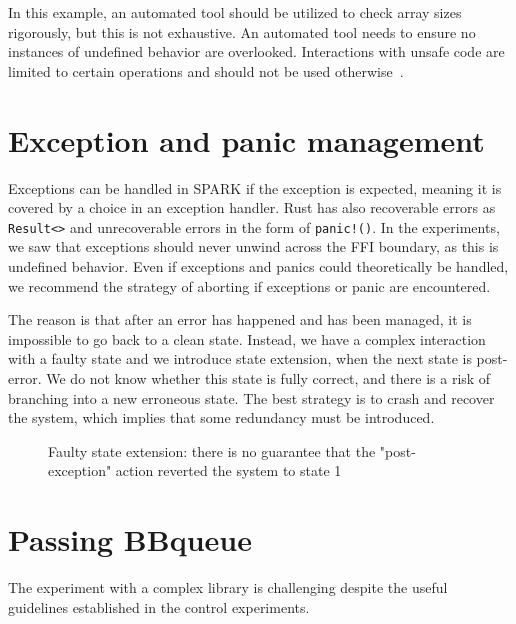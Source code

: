 \documentclass[nomenclature, english, bibtex]{kththesis}
\newcommand{\inlinecode}[1]{\texttt{#1}}
\begin{document}
{In this example, an automated tool should be utilized to check array sizes rigorously, but this is not exhaustive. An automated tool needs to ensure no instances of undefined behavior are overlooked. Interactions with unsafe code are limited to certain operations and should not be used otherwise~\cite{miller_step_2018, noauthor_unsafe_nodate, noauthor_unsafety_nodate}. 

\section{Exception and panic management}

Exceptions can be handled in SPARK if the exception is expected, meaning it is covered by a choice in an exception handler. 
Rust has also recoverable errors as \inlinecode{Result<>} and unrecoverable errors in the form of \inlinecode{panic!()}. In the experiments, we saw that exceptions should never unwind across the FFI boundary, as this is undefined behavior. Even if exceptions and panics could theoretically be handled, we recommend the strategy of aborting if exceptions or panic are encountered. 

The reason is that after an error has happened and has been managed, it is impossible to go back to a clean state. Instead, we have a complex interaction with a faulty state and we introduce state extension, when the next state is post-error. We do not know whether this state is fully correct, and there is a risk of branching into a new erroneous state. The best strategy is to crash and recover the system, which implies that some redundancy must be introduced.

\begin{figure}[ht!]
  \centering 

\caption[Faulty state extension]{Faulty state extension: there is no guarantee that the "post-exception" action reverted the system to state 1}
\end{figure}
\FloatBarrier



\section{Passing BBqueue}

The experiment with a complex library is challenging despite the useful guidelines established in the control experiments.

}
\end{document}
